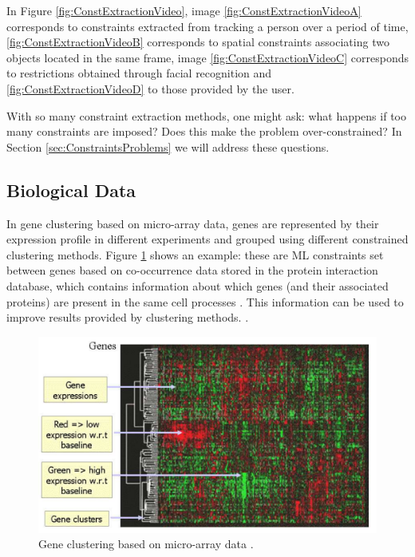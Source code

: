 In Figure \ref{fig:ConstExtractionVideo}, image \ref{fig:ConstExtractionVideoA} corresponds to constraints extracted from tracking a person over a period of time, \ref{fig:ConstExtractionVideoB} corresponds to spatial constraints associating two objects located in the same frame, image \ref{fig:ConstExtractionVideoC} corresponds to restrictions obtained through facial recognition and \ref{fig:ConstExtractionVideoD} to those provided by the user.

With so many constraint extraction methods, one might ask: what happens if too many constraints are imposed? Does this make the problem over-constrained? In Section \ref{sec:ConstraintsProblems} we will address these questions.

\subsection{Biological Data}

In gene clustering based on micro-array data, genes are represented by their expression profile in different experiments and grouped using different constrained clustering methods. Figure \ref{fig:GeneticApp} shows an example: these are \acs{ML} constraints set between genes based on co-occurrence data stored in the protein interaction database, which contains information about which genes (and their associated proteins) are present in the same cell processes \cite{xenarios2001dip}. This information can be used to improve results provided by clustering methods. \cite{segal2003discovering}.

\begin{figure}[!h]
	\centering
	\includegraphics[scale=0.3]{gfx/ConstClust/Genetica/Genes} 
	\caption[Gene clustering based on micro-array data.]{Gene clustering based on micro-array data \cite{davidson2007survey}.}\label{fig:GeneticApp}
\end{figure}


